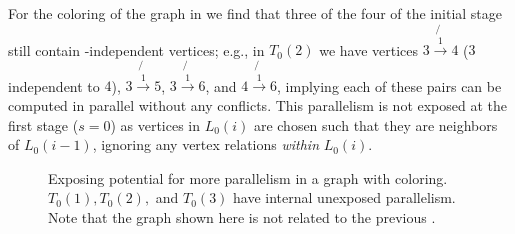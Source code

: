 For the \DONE coloring of the graph in  we find that
three of the four \levelGroups of the initial stage still contain \DONE-independent vertices; e.g., in $T_0(2)$ we have vertices $3 \not{\xrightarrow{1}} 4$ ($3$ \DONE
independent to $4$), $3 \not{\xrightarrow{1}} 5$, $3 \not{\xrightarrow{1}} 6$,
and $4 \not{\xrightarrow{1}} 6$, implying each of these pairs can be computed in
parallel without any \DONE conflicts. This parallelism is not exposed at
the first stage ($s=0$) as vertices in $L_0(i)$ are chosen such
that they are \DONE neighbors of $L_0(i-1)$, ignoring any vertex relations
\emph{within} $L_0(i)$.
     \begin{figure}[t]
     	\centering
     	\hspace{1.5em}
     	\hspace{1.5em}
        \caption{Exposing potential for more parallelism in a graph with \DONE coloring.
          $T_0(1),T_0(2),$ and
          $T_0(3)$ have internal unexposed parallelism.
          Note that the graph shown here is not
          related to the previous \stex.}
     	\label{fig:rec_d1_s1}
     \end{figure}

